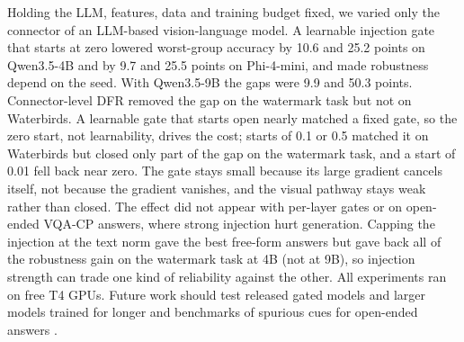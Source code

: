 Holding the LLM, features, data and training budget fixed, we varied only the connector of an LLM-based vision-language
model. A learnable injection gate that starts at zero lowered worst-group accuracy by 10.6 and 25.2 points on
Qwen3.5-4B and by 9.7 and 25.5 points on Phi-4-mini, and made robustness depend on the seed. With Qwen3.5-9B the
gaps were 9.9 and 50.3 points. Connector-level DFR removed the gap on the watermark task but not on Waterbirds. A learnable gate
that starts open nearly matched a fixed gate, so the zero start, not learnability, drives the cost; starts of 0.1
or 0.5 matched it on Waterbirds but closed only part of the gap on the watermark task, and a start of 0.01 fell
back near zero. The gate stays small because its large gradient
cancels itself, not because the gradient vanishes, and the visual pathway stays weak rather than closed. The effect
did not appear with per-layer gates or on open-ended VQA-CP answers, where strong injection hurt generation. Capping the
injection at the text norm gave the best free-form answers but gave back all of the robustness gain on the
watermark task at 4B (not at 9B), so injection strength can trade one kind of reliability against the other. All experiments ran on free T4 GPUs. Future work should test released gated models and larger models trained for longer
and benchmarks of spurious cues for
open-ended answers \citep{ye2026mmspubench,yang2025spuriverse}.
